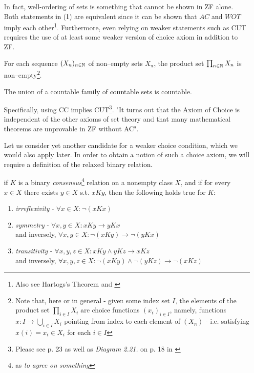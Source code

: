In fact, well-ordering of sets is something that cannot be shown in ZF alone. Both statements in (1) are equivalent since it can be shown \cite{herrlich2006ac} that $AC$ and $WOT$ imply each other\footnote{Also see Hartogs's Theorem and \cite{Gillman2002}}. Furthermore, even relying on weaker statements\cite{jech2003set} such as CUT requires the use of at least some weaker version of choice axiom in addition to ZF.

\begin{axiom}
  For each sequence $(X_n)_{n \in \mathbb{N}}$ of non–empty sets $X_n$, the product set $\prod_{n \in \mathbb{N}}
    X_n$ is non–empty\footnote{Note that, here or in general - given some index set $I$, the elements of the product set $\prod_{i \in I} X_i$ are choice functions $(x_i)_{i \in I}$, namely, functions $x: I \to \bigcup_{i \in I} X_i$ pointing from index to each element of $(X_n)$ - i.e. satisfying $x(i) = x_i \in X_i$ for each $i \in I$\cite{herrlich2006ac}}.
\end{axiom}

\begin{theorem}
  The union of a countable family of countable sets is countable.
\end{theorem}

Specifically, using CC implies CUT\footnote{Please see p. 23 as well as \textit{Diagram 2.21.} on p. 18 in \cite{herrlich2006ac}}. "It turns out that the Axiom of Choice is independent of the other axioms of set theory and that many mathematical theorems are unprovable in ZF without AC"\cite{jech2003set}.

Let us consider yet another candidate for a weaker choice condition, which we would also apply later. In order to obtain a notion of such a choice axiom, we will require a definition of the relaxed binary relation.

\begin{definition}
  if $K$ is a binary \textit{consensus}\footnote{as \textit{to agree on something}} relation on a nonempty class $X$, and if for every $x \in X$ there exists $y \in X$ s.t. $xKy$, then the following holds true for $K$:
  \begin{enumerate}
    \item \textit{irreflexivity} - $\forall x \in X: \neg (xKx) $
    \item \textit{symmetry} - $\forall x,y \in X:  xKy \rightarrow yKx$
          \\ and inversely, $\forall x,y \in X:  \neg (xKy) \rightarrow \neg (yKx)$
    \item \textit{transitivity} - $\forall x,y,z \in X:  xKy \land yKz  \rightarrow xKz$
          \\ and inversely, $\forall x,y,z \in X:  \neg (xKy) \land \neg (yKz)  \rightarrow \neg (xKz)$
  \end{enumerate}
\end{definition}

